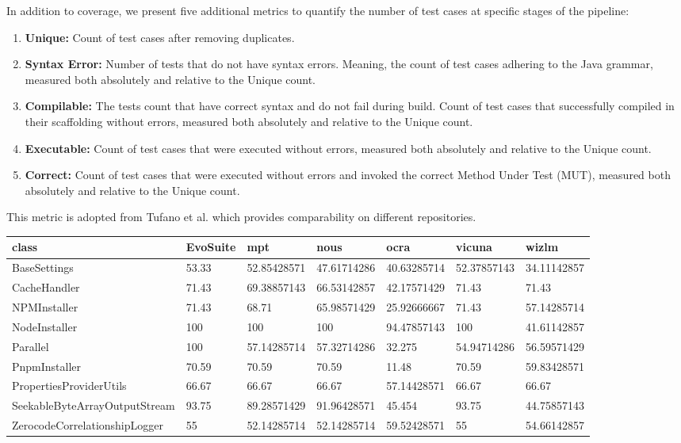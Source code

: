    In addition to coverage, we present five additional metrics to quantify the number of test cases at specific stages of the pipeline:

    \begin{enumerate}
        \item \textbf{Unique:} Count of test cases after removing duplicates.
        \item \textbf{Syntax Error:} Number of tests that do not have syntax errors. Meaning, the count of test cases adhering to the Java grammar, measured both absolutely and relative to the Unique count.
        \item \textbf{Compilable:} The tests count that have correct syntax and do not fail during build. Count of test cases that successfully compiled in their scaffolding without errors, measured both absolutely and relative to the Unique count.
        \item \textbf{Executable:} Count of test cases that were executed without errors, measured both absolutely and relative to the Unique count.
        \item \textbf{Correct:} Count of test cases that were executed without errors and invoked the correct Method Under Test (MUT), measured both absolutely and relative to the Unique count. 
    \end{enumerate}
    This metric is adopted from Tufano et al. \cite{tufano_unit_2021} which provides comparability on different repositories.

\begin{table}
\centering

\begin{tabular}{| l | l | l | l | l | l | l |}
\hline
\textbf{class} & \textbf{EvoSuite} & \textbf{mpt} & \textbf{nous} & \textbf{ocra} & \textbf{vicuna} & \textbf{wizlm} \\
\hline
BaseSettings & 53.33 & 52.85428571 & 47.61714286 & 40.63285714 & 52.37857143 & 34.11142857 \\
\hline
CacheHandler & 71.43 & 69.38857143 & 66.53142857 & 42.17571429 & 71.43 & 71.43 \\
\hline
NPMInstaller & 71.43 & 68.71 & 65.98571429 & 25.92666667 & 71.43 & 57.14285714 \\
\hline
NodeInstaller & 100 & 100 & 100 & 94.47857143 & 100 & 41.61142857 \\
\hline
Parallel & 100 & 57.14285714 & 57.32714286 & 32.275 & 54.94714286 & 56.59571429 \\
\hline
PnpmInstaller & 70.59 & 70.59 & 70.59 & 11.48 & 70.59 & 59.83428571 \\
\hline
PropertiesProviderUtils & 66.67 & 66.67 & 66.67 & 57.14428571 & 66.67 & 66.67 \\
\hline
SeekableByteArrayOutputStream & 93.75 & 89.28571429 & 91.96428571 & 45.454 & 93.75 & 44.75857143 \\
\hline
ZerocodeCorrelationshipLogger & 55 & 52.14285714 & 52.14285714 & 59.52428571 & 55 & 54.66142857 \\
\hline

\end{tabular}

\end{table}



